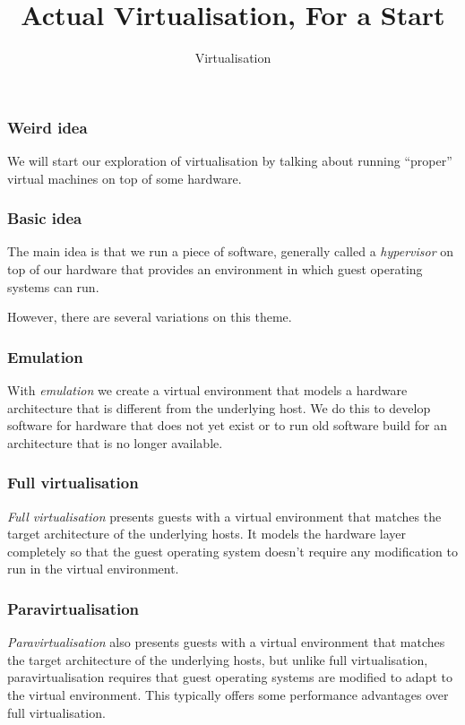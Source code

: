 \documentclass[10pt]{beamer}
\title{Actual Virtualisation, For a Start}
\author[ID720]{Virtualisation}
\institute[Otago Polytechnic]{
  Otago Polytechnic \\
  Dunedin, New Zealand \\
}
\date{}
\begin{document}
\begin{frame}[plain]
  \titlepage
\end{frame}


\begin{frame}
  \frametitle{Weird idea} 
  We will start our exploration of virtualisation by talking about running ``proper'' virtual machines on top of some hardware.
  \end{frame}
  
\begin{frame}
  \frametitle{Basic idea}
  
  The main idea is that we run a piece of software, generally called a \emph{hypervisor} on top of our 
  hardware that provides an environment in which guest operating systems can run.
   
  However, there are several variations on this theme.
\end{frame}
  
\begin{frame}
  \frametitle{Emulation}
  
   With \emph{emulation} we create a virtual environment that models a hardware architecture that is 
   different from the underlying host. We do this to develop software for hardware that does not yet exist or
   to run old software build for an architecture that is no longer available.
\end{frame}

\begin{frame}
  \frametitle{Full virtualisation}
  
   \emph{Full virtualisation} presents guests with a virtual environment that matches the target architecture of the underlying hosts. It models the hardware layer completely so that the guest operating system doesn't require any modification to run in the virtual environment.
\end{frame}

\begin{frame}
  \frametitle{Paravirtualisation}
  
   \emph{Paravirtualisation} also presents guests with a virtual environment that matches the target architecture of the underlying hosts, but unlike full virtualisation,
   paravirtualisation requires that guest operating systems are modified to adapt to the virtual environment. This typically offers some performance advantages 
   over full virtualisation.
   
\end{frame}
\end{document}
